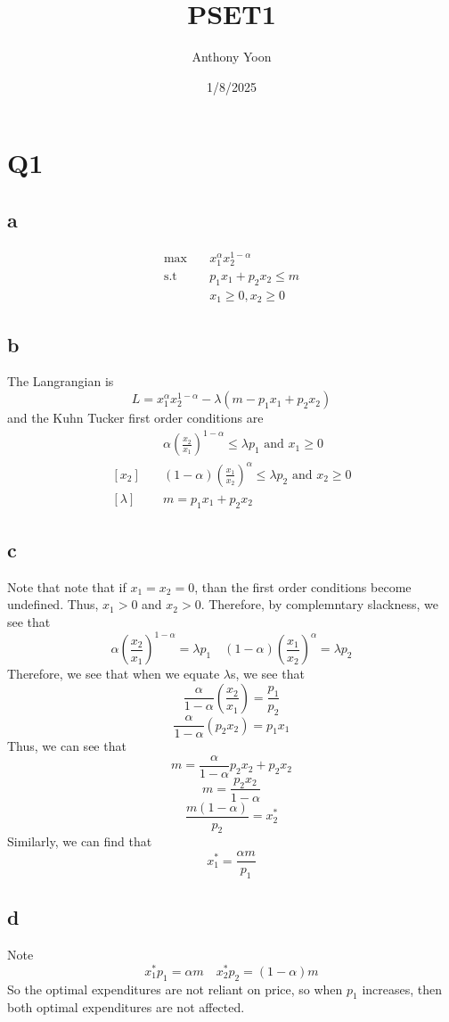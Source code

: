 \documentclass[12pt]{article}
\title{PSET1}
\author{Anthony Yoon}
\date{1/8/2025}
\newcommand{\st}{\text{s.t}}
\begin{document}
\maketitle
\section*{Q1}
\subsection*{a}
\begin{align*}
    \max & \quad x^\alpha_1 x_2^{1-\alpha}\\
    \st & \quad p_1 x_1 + p_2 x_2 \leq m \\
    & \quad x_1 \geq 0, x_2 \geq 0 
\end{align*}
\subsection*{b}
The Langrangian is 
\[
L =  x^\alpha_1 x_2^{1-\alpha} - \lambda(m - p_1x_1 + p_2 x_2)
\]
and the Kuhn Tucker first order conditions are
\begin{align*}
    [x_1] & \quad \alpha \left( \frac{x_2}{x_1} \right)^{1-\alpha} \leq \lambda p_1 \text{ and } x_1 \geq 0\\
    [x_2] & \quad (1-\alpha) \left( \frac{x_1}{x_2} \right)^{\alpha} \leq \lambda p_2 \text{ and } x_2 \geq 0\\
    [\lambda] & \quad m = p_1 x_1 + p_2 x_2
\end{align*}
\subsection*{c}
Note that note that if $x_1 = x_2 = 0$, than the first order conditions become undefined. Thus, $x_1 > 0$ and $x_2 > 0$. Therefore, by complemntary slackness, we see that 
\[
    \alpha \left( \frac{x_2}{x_1} \right)^{1-\alpha} = \lambda p_1 \quad (1-\alpha) \left( \frac{x_1}{x_2} \right)^{\alpha} = \lambda p_2
\]
Therefore, we see that when we equate $\lambda$s, we see that 
\[
 \frac{\alpha}{1-\alpha} \left( \frac{x_2}{x_1} \right) = \frac{p_1}{p_2}
\]
\[
\frac{\alpha}{1-\alpha} \left( p_2x_2 \right) = p_1 x_1
\]
Thus, we can see that 
\[
m = \frac{\alpha}{1-\alpha} p_2 x_2 + p_2 x_2
\]
\[
m = \frac{p_2 x_2}{1-\alpha} 
\]
\[
\frac{m(1-\alpha)}{p_2} = x_2^*
\]
Similarly, we can find that 
\[
x_1^* = \frac{\alpha m}{p_1}
\]
\subsection*{d}
Note
\[
x_1^* p_1 = \alpha m \quad x_2^* p_2 = (1-\alpha)m
\]
So the optimal expenditures are not reliant on price, so when $p_1$ increases, then both optimal expenditures are not affected. 
\end{document}
